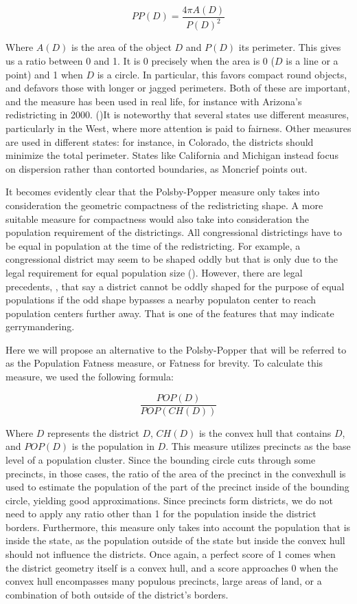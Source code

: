 \documentclass[letterpaper]{article}
\begin{document}
\[
	PP(D) = \frac{4\pi A(D)}{P(D)^2}
\]


Where $A(D)$ is the area of the object $D$ and $P(D)$ its perimeter. This gives us a ratio between 0 and 1. It is 0 precisely when the area is 0 ($D$ is a line or a point) and 1 when $D$ is a circle. In particular, this favors compact round objects, and defavors those with longer or jagged perimeters. Both of these are important, and the measure has been used in real life, for instance with Arizona’s redistricting in 2000. (\cite{moncrief})It is noteworthy that several states use different measures, particularly in the West, where more attention is paid to fairness.
Other measures are used in different states: for instance, in Colorado, the districts should minimize the total perimeter. States like California and Michigan instead focus on dispersion rather than contorted boundaries, as Moncrief points out. 

It becomes evidently clear that the Polsby-Popper measure only takes into consideration the geometric compactness of the redistricting shape. A more suitable measure for compactness would also take into consideration the population requirement of the districtings. All congressional districtings have to be equal in population at the time of the redistricting. For example, a congressional district may seem to be shaped oddly but that is only due to the legal requirement for equal population size (\cite{westberryVsanders}). However, there are legal precedents, \cite{sandiego}, that say a district cannot be oddly shaped for the purpose of equal populations if the odd shape bypasses a nearby populaton center to reach population centers further away. That is one of the features that may indicate gerrymandering.

Here we will propose an alternative to the Polsby-Popper that will be referred to as the Population Fatness measure, or Fatness for brevity. To calculate this measure, we used the following formula:

\[
	\frac{POP(D)}{POP(CH(D))}
\]

Where $D$ represents the district $D$, $CH(D)$ is the convex hull that contains $D$, and $POP(D)$ is the population in $D$. This measure utilizes precincts as the base level of a population cluster. Since the bounding circle cuts through some precincts, in those cases, the ratio of the area of the precinct in the convexhull is used to estimate the population of the part of the precinct inside of the bounding circle, yielding good approximations. Since precincts form districts, we do not need to apply any ratio other than 1 for the population inside the district borders. Furthermore, this measure only takes into account the population that is inside the state, as the population outside of the state but inside the convex hull should not influence the districts. Once again, a perfect score of 1 comes when the district geometry itself is a convex hull, and a score approaches 0 when the convex hull encompasses many populous precincts, large areas of land, or a combination of both outside of the district's borders.
\end{document}
